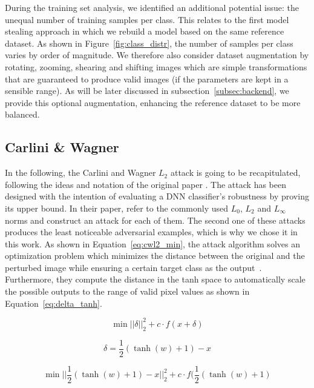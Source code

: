 During the training set analysis, we identified an additional potential issue: the unequal number of training samples per class.
This relates to the first model stealing approach in which we rebuild a model based on the same reference dataset.
As shown in Figure~\ref{fig:class_distr}, the number of samples per class varies by order of magnitude.
We therefore also consider dataset augmentation by rotating, zooming, shearing and shifting images which are simple transformations that are guaranteed to produce valid images (if the parameters are kept in a sensible range).
As will be later discussed in subsection~\ref{subsec:backend}, we provide this optional augmentation, enhancing the reference dataset to be more balanced.

\subsection{Carlini \& Wagner}\label{subsec:cwl2}
In the following, the Carlini and Wagner $L_2$ attack is going to be recapitulated, following the ideas and notation of the original paper \cite{carlini2017towards}.
The attack has been designed with the intention of evaluating a DNN classifier's robustness by proving its upper bound.
In their paper, \citeauthor{carlini2017towards} refer to the commonly used $L_0$, $L_2$ and $L_\infty$ norms and construct an attack for each of them.
The second one of these attacks produces the least noticeable adversarial examples, which is why we chose it in this work.
As shown in Equation~\ref{eq:cwl2_min}, the attack algorithm solves an optimization problem which minimizes the distance between the original and the perturbed image while ensuring a certain target class as the output~\cite{carlini2017towards}.
Furthermore, they compute the distance in the tanh space to automatically scale the possible outputs to the range of valid pixel values as shown in Equation~\ref{eq:delta_tanh}.

\begin{equation}\label{eq:cwl2_min}
\min ||\delta||^2_2 + c \cdot f(x + \delta)
\end{equation}

\begin{equation}\label{eq:delta_tanh}
\delta = \frac{1}{2}(\tanh(w)+1) - x
\end{equation}

\begin{equation}\label{eq:cwl2_min_final}
\min ||\frac{1}{2}(\tanh(w)+1)-x||^2_2 + c \cdot f(\frac{1}{2}(\tanh(w)+1)
\end{equation}

